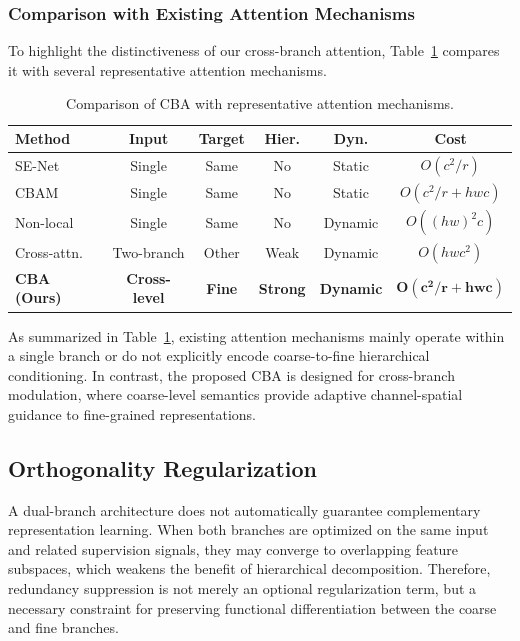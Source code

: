 \documentclass[pdflatex,sn-mathphys-num]{sn-jnl}
\theoremstyle{thmstyleone}%
\theoremstyle{thmstyletwo}%
\theoremstyle{thmstylethree}%
\begin{document}
\subsubsection{Comparison with Existing Attention Mechanisms}
To highlight the distinctiveness of our cross-branch attention, Table~\ref{tab:attention_comparison} compares it with several representative attention mechanisms.
\begin{table}[htbp]
    \centering
    \caption{Comparison of CBA with representative attention mechanisms.}
    \label{tab:attention_comparison}
    \setlength{\tabcolsep}{4pt}
    \renewcommand{\arraystretch}{1.1}
    \small
    \begin{tabular}{@{}lccccc@{}}
    \toprule
    \textbf{Method} & \textbf{Input} & \textbf{Target} & \textbf{Hier.} & \textbf{Dyn.} & \textbf{Cost} \\
    \midrule
    SE-Net      & Single     & Same  & No   & Static  & $O(c^2/r)$ \\
    CBAM        & Single     & Same  & No   & Static  & $O(c^2/r + hwc)$ \\
    Non-local   & Single     & Same  & No   & Dynamic & $O((hw)^2c)$ \\
    Cross-attn. & Two-branch & Other & Weak & Dynamic & $O(hwc^2)$ \\
    \midrule
    \textbf{CBA (Ours)} & \textbf{Cross-level} & \textbf{Fine} & \textbf{Strong} & \textbf{Dynamic} & $\mathbf{O(c^2/r + hwc)}$ \\
    \bottomrule
    \end{tabular}
\end{table}
As summarized in Table~\ref{tab:attention_comparison}, existing attention mechanisms mainly operate within a single branch or do not explicitly encode coarse-to-fine hierarchical conditioning. In contrast, the proposed CBA is designed for cross-branch modulation, where coarse-level semantics provide adaptive channel-spatial guidance to fine-grained representations.

\subsection{Orthogonality Regularization}
\label{sec:orth}

A dual-branch architecture does not automatically guarantee complementary representation learning. 
When both branches are optimized on the same input and related supervision signals, they may converge to overlapping feature subspaces, which weakens the benefit of hierarchical decomposition. 
Therefore, redundancy suppression is not merely an optional regularization term, but a necessary constraint for preserving functional differentiation between the coarse and fine branches.
\end{document}
